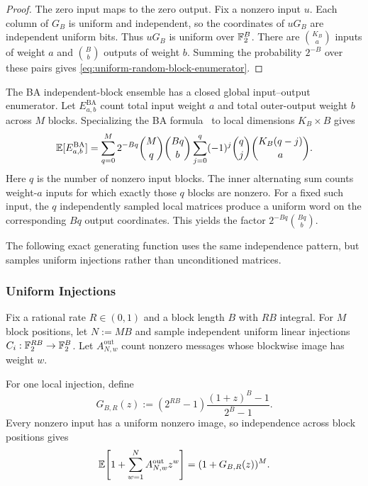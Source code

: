 \begin{proof}
The zero input maps to the zero output. Fix a nonzero input $u$. Each column
of $G_B$ is uniform and independent, so the coordinates of $uG_B$ are
independent uniform bits. Thus $uG_B$ is uniform over $\mathbb F_2^B$. There are
$\binom{K_B}{a}$ inputs of weight $a$ and $\binom{B}{b}$ outputs of weight
$b$. Summing the probability $2^{-B}$ over these pairs gives
\eqref{eq:uniform-random-block-enumerator}.
\end{proof}

The BA independent-block ensemble has a closed global input--output
enumerator. Let $E^{\mathrm{BA}}_{a,b}$ count total input weight
$a$ and total outer-output weight $b$ across $M$ blocks. Specializing the BA
formula~\cite{KolesnikovEtAl2026BA} to local dimensions
$K_B\times B$ gives
\begin{equation}
  \mathbb E[E^{\mathrm{BA}}_{a,b}]
  =
  \sum_{q=0}^{M}
  2^{-Bq}\binom{M}{q}\binom{Bq}{b}
  \sum_{j=0}^{q}(-1)^j\binom{q}{j}
  \binom{K_B(q-j)}{a}.
  \label{eq:ba-independent-block-enumerator}
\end{equation}
Here $q$ is the number of nonzero input blocks. The inner alternating sum
counts weight-$a$ inputs for which exactly those $q$ blocks are nonzero. For a
fixed such input, the $q$ independently sampled local matrices produce a
uniform word on the corresponding $Bq$ output coordinates. This yields the
factor $2^{-Bq}\binom{Bq}{b}$.

The following exact generating function uses the same independence pattern,
but samples uniform injections rather than unconditioned matrices.

\subsubsection{Uniform Injections}
Fix a rational rate $R\in(0,1)$ and a block length $B$ with $RB$ integral.
For $M$ block positions, let $N:=MB$ and sample independent uniform linear
injections $C_i:\mathbb F_2^{RB}\to\mathbb F_2^B$. Let $A_{N,w}^{\mathrm{out}}$ count
nonzero messages whose blockwise image has weight $w$.

For one local injection, define
\begin{equation}
  G_{B,R}(z)
  :=
  (2^{RB}-1)\frac{(1+z)^B-1}{2^B-1}.
  \label{eq:injection-local-mass}
\end{equation}
Every nonzero input has a uniform nonzero image, so independence across block
positions gives
\begin{equation}
  \mathbb E\!\left[
    1+\sum_{w=1}^{N}A_{N,w}^{\mathrm{out}}z^w
  \right]
  =(1+G_{B,R}(z))^M.
  \label{eq:injection-global-mass}
\end{equation}
